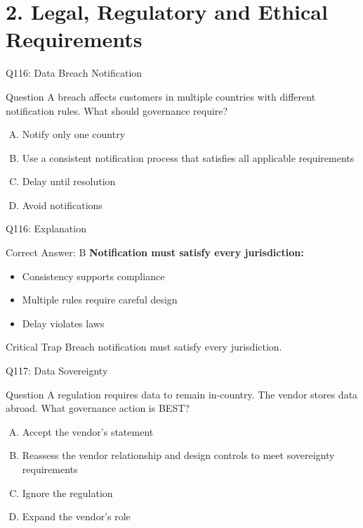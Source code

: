 \documentclass{beamer}
\begin{document}
	\section{2. Legal, Regulatory and Ethical Requirements}
	
	\begin{frame}{Q116: Data Breach Notification}
		\begin{block}{Question}
			A breach affects customers in multiple countries with different notification rules. What should governance require?
		\end{block}
		\begin{enumerate}[(A)]
			\item Notify only one country
			\item Use a consistent notification process that satisfies all applicable requirements
			\item Delay until resolution
			\item Avoid notifications
		\end{enumerate}
	\end{frame}
	
	\begin{frame}{Q116: Explanation}
		\begin{block}{Correct Answer: B}
			\textbf{Notification must satisfy every jurisdiction:}
			\begin{itemize}
				\item Consistency supports compliance
				\item Multiple rules require careful design
				\item Delay violates laws
			\end{itemize}
		\end{block}
		\begin{alertblock}{Critical Trap}
			Breach notification must satisfy every jurisdiction.
		\end{alertblock}
	\end{frame}
	
	\begin{frame}{Q117: Data Sovereignty}
		\begin{block}{Question}
			A regulation requires data to remain in-country. The vendor stores data abroad. What governance action is BEST?
		\end{block}
		\begin{enumerate}[(A)]
			\item Accept the vendor's statement
			\item Reassess the vendor relationship and design controls to meet sovereignty requirements
			\item Ignore the regulation
			\item Expand the vendor's role
		\end{enumerate}
	\end{frame}
	
\end{document}
